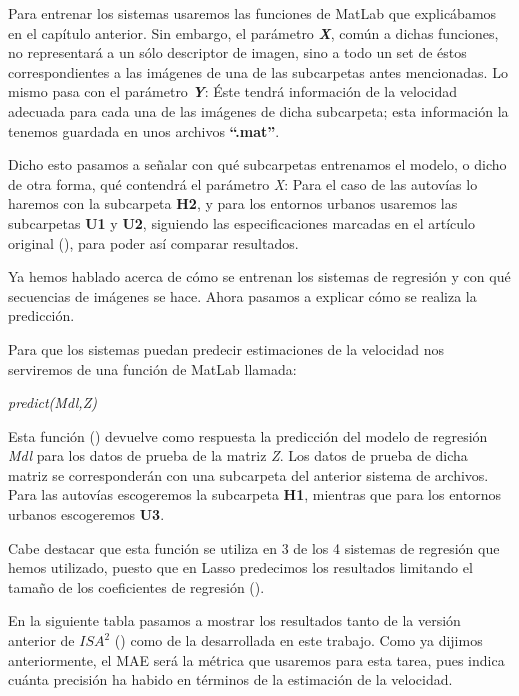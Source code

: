 Para entrenar los sistemas usaremos las funciones de MatLab que explicábamos en el capítulo anterior. Sin embargo, el parámetro \textbf{\textit{X}}, común a dichas funciones, no representará a un sólo descriptor de imagen, sino a todo un set de éstos correspondientes a las imágenes de una de las subcarpetas antes mencionadas. Lo mismo pasa con el parámetro \textbf{\textit{Y}}: Éste tendrá información de la velocidad adecuada para cada una de las imágenes de dicha subcarpeta; esta información la tenemos guardada en unos archivos \textbf{``.mat''}.

Dicho esto pasamos a señalar con qué subcarpetas entrenamos el modelo, o dicho de otra forma, qué contendrá el parámetro \textit{X}: Para el caso de las autovías lo haremos con la subcarpeta \textbf{H2}, y para los entornos urbanos usaremos las subcarpetas \textbf{U1} y \textbf{U2}, siguiendo las especificaciones marcadas en el artículo original (\cite{isa2}), para poder así comparar resultados.

Ya hemos hablado acerca de cómo se entrenan los sistemas de regresión y con qué secuencias de imágenes se hace. Ahora pasamos a explicar cómo se realiza la predicción.

Para que los sistemas puedan predecir estimaciones de la velocidad nos serviremos de una función de MatLab llamada:

\begin{center}
\textit{predict(Mdl,Z)}
\end{center}

Esta función (\cite{predict}) devuelve como respuesta la predicción del modelo de regresión \textit{Mdl} para los datos de prueba de la matriz \textit{Z}. Los datos de prueba de dicha matriz se corresponderán con una subcarpeta del anterior sistema de archivos. Para las autovías escogeremos la subcarpeta \textbf{H1}, mientras que para los entornos urbanos escogeremos \textbf{U3}.

Cabe destacar que esta función se utiliza en 3 de los 4 sistemas de regresión que hemos utilizado, puesto que en Lasso predecimos los resultados limitando el tamaño de los coeficientes de regresión (\cite{coef_lasso}).

En la siguiente tabla pasamos a mostrar los resultados tanto de la versión anterior de $ISA^{2}$ (\cite{isa2}) como de la desarrollada en este trabajo. Como ya dijimos anteriormente, el \ac{MAE} será la métrica que usaremos para esta tarea, pues indica cuánta precisión ha habido en términos de la estimación de la velocidad.

